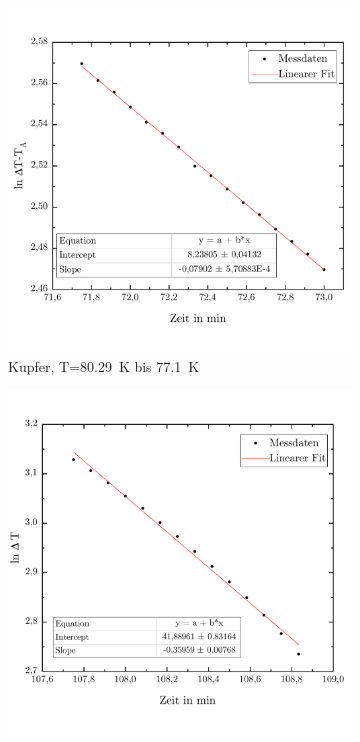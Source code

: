 \documentclass[parskip=half, a4paper,twoside,final]{article}
\begin{document}
\begin{figure}[ht!]
  \centering
  \begin{subfigure}[b!]{0.45\textwidth}
    \includegraphics[width=\textwidth]{Bilder/77_1_80_29__lnDeltaT_TA.pdf}
    \caption{Kupfer, T=\SI{80,29}{\kelvin} bis \SI{77,1}{\kelvin}}
  \end{subfigure}
  \begin{subfigure}[b!]{0.45\textwidth}
    \includegraphics[width=\textwidth]{Bilder/28_98__37_19__lnDeltaT.pdf}

\end{subfigure}
\end{figure}
\end{document}
